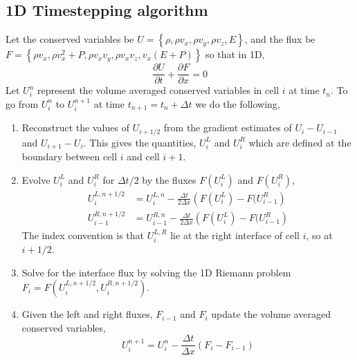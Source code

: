 \documentclass{article}
\newcommand{\ppderiv}[2]{\frac{\partial #1}{\partial #2}}
\begin{document}
\subsection{1D Timestepping algorithm} 
Let the conserved variables be $U = \left\{\rho, \rho v_x, \rho v_y, \rho v_z, E \right\}$, and the flux be $F = \left\{ \rho v_x, \rho v_x^2 + P, \rho v_x v_y, \rho v_x v_z, v_x (E + P) \right\}$ so that in 1D,
\begin{equation}
	\ppderiv{U}{t} +\ppderiv{F}{x} = 0
\end{equation}
Let $U_i^n$ represent the volume averaged conserved variables in cell $i$ at time $t_n$. 
To go from $U_i^n$ to $U_i^{n+1}$ at time $t_{n+1} = t_n + \Delta t$ we do the following,
\begin{enumerate}
	\item Reconstruct the values of $U_{i+1/2}$ from the gradient estimates of $U_{i}-U_{i-1}$ and $U_{i+1}-U_{i}$. This gives the quantities, $U_i^L$ and $U_i^R$ which are defined at the boundary between cell $i$ and cell $i+1$. 
	\item Evolve $U_i^L$ and $U_i^R$ for $\Delta t/2$ by the fluxes $F(U_i^L)$ and $F(U_i^R)$,
	\begin{align}
		U_i^{L,n+1/2} &= U_i^{L,n} - \frac{\Delta t}{2 \Delta x} \left( F(U_i^L) -F(U_{i-1}^R \right) \\
		U_{i-1}^{R,n+1/2} &= U_{i-1}^{R,n} - \frac{\Delta t}{2 \Delta x} \left( F(U_i^L) -F(U_{i-1}^R \right)
	\end{align}
	The index convention is that $U_i^{L,R}$ lie at the right interface of cell $i$, so at $i+1/2$. 
	\item Solve for the interface flux by solving the 1D Riemann problem $F_i = F(U_i^{L,n+1/2},U_i^{R,n+1/2})$. 
	\item Given the left and right fluxes, $F_{i-1}$ and $F_{i}$ update the volume averaged conserved variables, 
	\begin{equation}
		U_i^{n+1} = U_i^n - \frac{\Delta t}{\Delta x} \left(F_i - F_{i-1} \right)
	\end{equation}

\end{enumerate}
\end{document}
